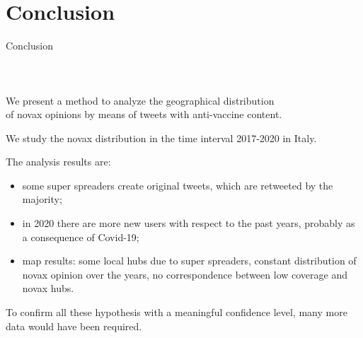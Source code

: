 \documentclass[9pt]{beamer}
\begin{document}
\section{Conclusion}
\begin{frame}{Conclusion}
	   \framesubtitle{~} %

	 \begin{block}{}\centering We present a method to analyze the geographical distribution\\ of novax opinions by means of tweets with anti-vaccine content.\end{block}

	\medskip
	
	\pause
	We study the novax distribution in the time interval 2017-2020 in Italy.
	
	\medskip
	
	The analysis results are:
	
	\medskip
	
	\begin{itemize}
	    \item some \alert{super spreaders} create original tweets, which are retweeted by the majority;
	    
	    \item in \alert{2020} there are more \alert{new users} with respect to the past years, probably as a consequence of Covid-19; 
	    
	    \item \alert{map results}: some local hubs due to super spreaders, constant distribution of novax opinion over the years, no correspondence between low coverage and novax hubs.
	   
	\end{itemize}
	
	\medskip
	
	To confirm all these hypothesis with a meaningful confidence level, \alert{many more data} would have been required.
	\end{frame}
	
\end{document}
